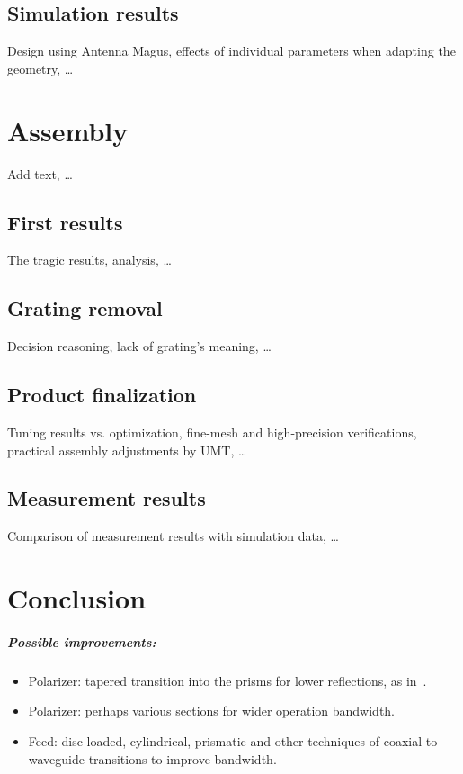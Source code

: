 \documentclass[11pt,a4paper,twoside,openany]{report}
\begin{document}
\section{Simulation results}
Design using Antenna Magus, effects of individual parameters when adapting the geometry, \dots

\chapter{Assembly}
\label{chapter:assembly}
Add text, \dots

\section{First results}
The tragic results, analysis, \dots

\section{Grating removal}
Decision reasoning, lack of grating's meaning, \dots

\section{Product finalization}
Tuning results vs. optimization, fine-mesh and high-precision verifications, practical assembly adjustments by UMT, \dots

\section{Measurement results}
Comparison of measurement results with simulation data, \dots

\chapter*{Conclusion}
\label{chap:conclusion}

\lipsum[10-13]

\paragraph{Possible improvements:}
\begin{itemize}
    \item Polarizer: tapered transition into the prisms for lower reflections, as in~\parencite{bhardwaj-volakis:hexagonal-waveguide-based-circularly-polarized-horn-antennas-for-submmwave-terahertz-band}.
    \item Polarizer: perhaps various sections for wider operation bandwidth.
    \item Feed: disc-loaded, cylindrical, prismatic and other techniques of coaxial-to-waveguide transitions to improve bandwidth.
\end{itemize}
\end{document}
